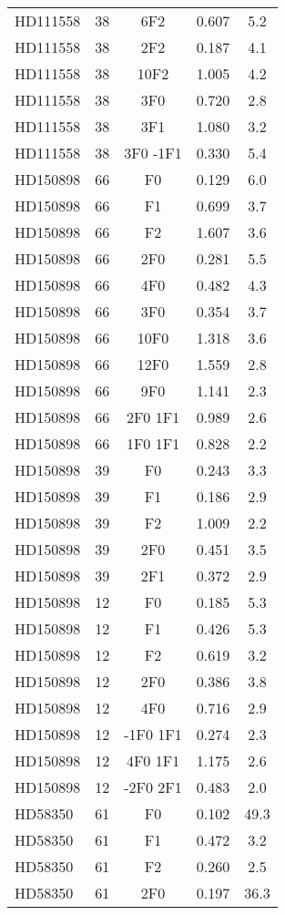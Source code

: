 \begin{table*}
\begin{tabular}{l c c c c}
HD111558 & 38 & 6F2 & 0.607 & 5.2\\ 
HD111558 & 38 & 2F2 & 0.187 & 4.1\\ 
HD111558 & 38 & 10F2 & 1.005 & 4.2\\ 
HD111558 & 38 & 3F0 & 0.720 & 2.8\\ 
HD111558 & 38 & 3F1 & 1.080 & 3.2\\ 
HD111558 & 38 & 3F0 -1F1 & 0.330 & 5.4\\ 
\hline
HD150898 & 66 & F0 & 0.129 & 6.0\\ 
HD150898 & 66 & F1 & 0.699 & 3.7\\ 
HD150898 & 66 & F2 & 1.607 & 3.6\\ 
HD150898 & 66 & 2F0 & 0.281 & 5.5\\ 
HD150898 & 66 & 4F0 & 0.482 & 4.3\\ 
HD150898 & 66 & 3F0 & 0.354 & 3.7\\ 
HD150898 & 66 & 10F0 & 1.318 & 3.6\\ 
HD150898 & 66 & 12F0 & 1.559 & 2.8\\ 
HD150898 & 66 & 9F0 & 1.141 & 2.3\\ 
HD150898 & 66 & 2F0 1F1 & 0.989 & 2.6\\ 
HD150898 & 66 & 1F0 1F1 & 0.828 & 2.2\\ 
\hline
HD150898 & 39 & F0 & 0.243 & 3.3\\ 
HD150898 & 39 & F1 & 0.186 & 2.9\\ 
HD150898 & 39 & F2 & 1.009 & 2.2\\ 
HD150898 & 39 & 2F0 & 0.451 & 3.5\\ 
HD150898 & 39 & 2F1 & 0.372 & 2.9\\ 
\hline
HD150898 & 12 & F0 & 0.185 & 5.3\\ 
HD150898 & 12 & F1 & 0.426 & 5.3\\ 
HD150898 & 12 & F2 & 0.619 & 3.2\\ 
HD150898 & 12 & 2F0 & 0.386 & 3.8\\ 
HD150898 & 12 & 4F0 & 0.716 & 2.9\\ 
HD150898 & 12 & -1F0 1F1 & 0.274 & 2.3\\ 
HD150898 & 12 & 4F0 1F1 & 1.175 & 2.6\\ 
HD150898 & 12 & -2F0 2F1 & 0.483 & 2.0\\ 
\hline
HD58350 & 61 & F0 & 0.102 & 49.3\\ 
HD58350 & 61 & F1 & 0.472 & 3.2\\ 
HD58350 & 61 & F2 & 0.260 & 2.5\\ 
HD58350 & 61 & 2F0 & 0.197 & 36.3\\ 

\end{tabular}
\end{table*}
